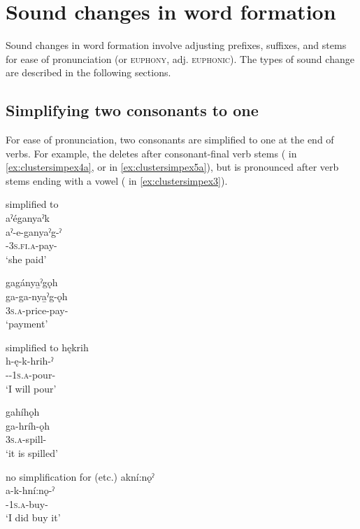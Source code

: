 \chapter{Sound changes in word formation} \label{Sound changes in word formation}
Sound changes in word formation involve adjusting prefixes, suffixes, and stems for ease of pronunciation (or \textsc{euphony}, adj. \textsc{euphonic}). The types of sound change are described in the following sections.

\section{Simplifying two consonants to one} \label{Simplifying two consonants to one}
For ease of pronunciation, two consonants are simplified to one at the end of verbs. For example, the  {\punctual} deletes after consonant-final verb stems ( in \ref{ex:clustersimpex4a}, or  in \ref{ex:clustersimpex5a}), but is pronounced after verb stems ending with a vowel ( in \ref{ex:clustersimpex3}).

\ea\label{ex:clustersimpex4}  simplified to \\
\ea aˀéganyaˀk\\\label{ex:clustersimpex4a}
\gll aˀ-e-ganyaˀg-ˀ\\
 {\factual}-\textsc{3s.fi.a}-pay-{\punctual}\\
\glt `she paid'

\ex gagánya̱ˀgǫh\\\label{ex:clustersimpex4b}
\gll ga-ga-nya̱ˀg-ǫh\\
 \textsc{3s.a}-price-pay-{\stative}\\
\glt `payment'
\z
\z

\ea\label{ex:clustersimpex5}  simplified to 
\ea hękrih\\\label{ex:clustersimpex5a}
\gll h-ę-k-hrih-ˀ\\
 {\translocative}-{\future}-\textsc{1s.a}-pour-{\punctual}\\
\glt `I will pour'


\ex gahíhǫh\\\label{ex:clustersimpex5b}
\gll ga-hríh-ǫh\\
 \textsc{3s.a}-spill-{\stative}\\
\glt `it is spilled'
\z
\z

\ea\label{ex:clustersimpex3} no simplification for  (etc.)
\ea akní:nǫˀ\\
\gll a-k-hní:nǫ-ˀ\\
 {\factual}-\textsc{1s.a}-buy-{\punctual}\\
\glt `I did buy it'

